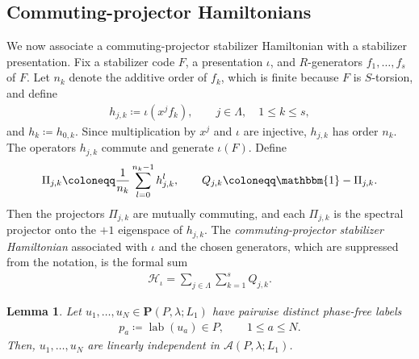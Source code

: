 \documentclass[sn-mathphys-num]{sn-jnl}
\newtheorem{lemma}{Lemma}[section]
\theoremstyle{definition}
\numberwithin{equation}{section}
\theoremstyle{definition}
\def\CA{{\mathcal A}}
\def\CH {{\mathcal H}}
\def\La{{\Lambda}}
\def\l{{\lambda}}
\def\lab{\operatorname{lab}}
\newcommand{\id}{\mathbbm{1}}
\begin{document}
\subsection{Commuting-projector Hamiltonians}\label{sec:comm_proj_hams}
We now associate a commuting-projector stabilizer Hamiltonian with a
stabilizer presentation. Fix a stabilizer code $F$, a presentation
$\iota$, and $R$-generators $f_1,\ldots,f_s$ of $F$. Let
$n_k$ denote the additive order of $f_k$, which is finite because $F$ is
$S$-torsion, and define
 \begin{align}\label{eq:translated_stabilizers_commute}
    h_{j,k}\coloneqq\iota (x^jf_k),
    \qquad j\in\La,\quad 1\leqslant k\leqslant s,
\end{align}
and $h_k\coloneqq h_{0,k}$. Since multiplication by $x^j$ and $\iota$ are
injective, $h_{j,k}$ has order $n_k$. The operators $h_{j,k}$ commute and
generate $\iota(F)$. Define
\begin{align}\label{eq:stabilizer_projector}
    \Pi_{j,k}
    \coloneqq
    \frac{1}{n_k}\sum_{l=0}^{n_k-1}h_{j,k}^{l},
    \qquad
    Q_{j,k}\coloneqq\id-\Pi_{j,k}.
\end{align}
Then the projectors $\Pi_{j,k}$ are mutually commuting, and each
$\Pi_{j,k}$ is the spectral projector onto the $+1$ eigenspace of
$h_{j,k}$. The
\textit{commuting-projector stabilizer Hamiltonian} associated with $\iota$
and the chosen generators, which are suppressed from the notation, is the
formal sum
\begin{align}\label{eq:stabilizer_hamiltonian}
    \CH_{\iota}
    =\sum_{j\in\La}\sum_{k=1}^{s}Q_{j,k}.
\end{align}

\begin{lemma}\label{lem:linear_independence_quasi_pauli}
Let $u_1,\ldots,u_N\in\textbf{P}(P,\l;L_1)$ have pairwise distinct
phase-free labels
\begin{align*}
    p_a\coloneqq\lab(u_a)\in P,
    \qquad 1\leqslant a\leqslant N.
\end{align*}
Then, $u_1,\ldots,u_N$ are linearly independent in
$\CA(P,\l;L_1)$.
\end{lemma}
\end{document}
